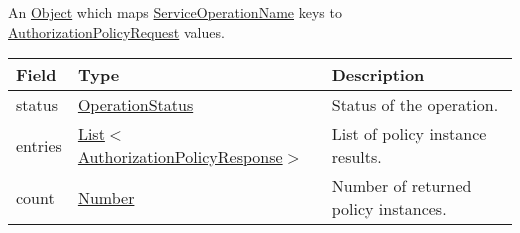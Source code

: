 \documentclass[a4paper]{arrowhead}
\newcommand{\pref}[1]{{\textcolor{ArrowheadGrey}{\hyperref[sec:model:primitives:#1]{#1}}}}
\begin{document}

An \pref{Object} which maps \pref{ServiceOperationName} keys to \hyperref[sec:model:AuthorizationPolicyRequest]{AuthorizationPolicyRequest} values.


\begin{table}[ht!]
\begin{tabularx}{\textwidth}{| p{2.5cm} | p{5.5cm} | X |} \hline
\rowcolor{gray!33} Field & Type    & Description \\ \hline
status & \pref{OperationStatus} & Status of the operation. \\ \hline
entries & \pref{List}$<$\hyperref[sec:model:AuthorizationPolicyResponse]{AuthorizationPolicyResponse}$>$  & List of policy instance results. \\ \hline
count & \pref{Number} & Number of returned policy instances. \\ \hline
\end{tabularx}
\end{table}

\clearpage

 
\end{document}
